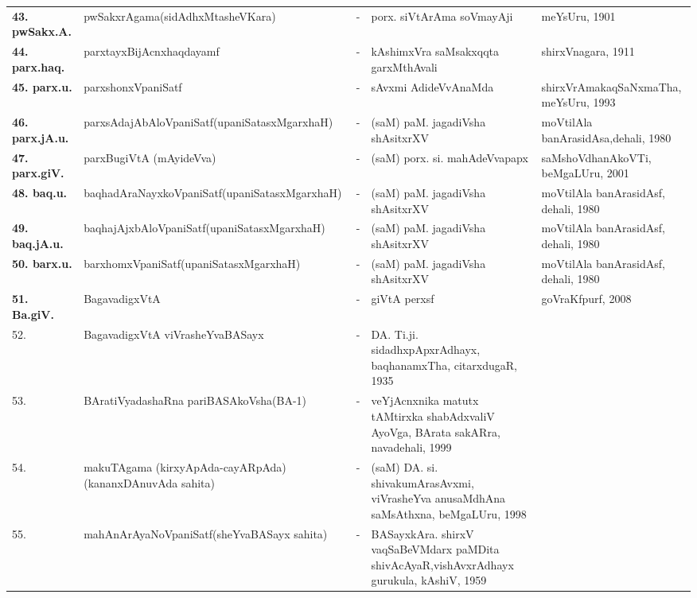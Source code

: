 {\begin{longtable}{lp{5cm}cp{5cm}<{\raggedright}p{3cm}<{\raggedright}@{}}
{\bf 43. pwSakx.A.} & pwSakxrAgama\newline (sidAdhxMtasheVKara) &-& porx. siVtArAma soVmayAji & meYsUru, 1901\\
{\bf 44. parx.haq.} & parxtayxBijAcnxhaqdayamf &-& kAshimxVra saMsakxqqta garxMthAvali & shirxVnagara, 1911\\
{\bf 45. parx.u.} & parxshonxVpaniSatf &-& sAvxmi AdideVvAnaMda & shirxVrAmakaqSaNxmaTha, meYsUru, 1993\\
{\bf 46. parx.jA.u.} & parxsAdajAbAloVpaniSatf\newline (upaniSatasxMgarxhaH) &-& (saM) paM. jagadiVsha shAsitxrXV & moVtilAla banArasidAsa,\newline dehali, 1980\\
{\bf 47. parx.giV.} & parxBugiVtA (mAyideVva) &-& (saM) porx. si. mahAdeVvapapx & saMshoVdhanAkoVTi, beMgaLUru, 2001\\
{\bf 48. baq.u.} & baqhadAraNayxkoVpaniSatf\newline (upaniSatasxMgarxhaH) &-& (saM) paM. jagadiVsha shAsitxrXV & moVtilAla banArasidAsf, dehali, 1980\\
{\bf 49. baq.jA.u.} & baqhajAjxbAloVpaniSatf\newline (upaniSatasxMgarxhaH) &-& (saM) paM. jagadiVsha shAsitxrXV & moVtilAla banArasidAsf, dehali, 1980\\
{\bf 50. barx.u.} & barxhomxVpaniSatf\newline (upaniSatasxMgarxhaH) &-& (saM) paM. jagadiVsha shAsitxrXV & moVtilAla banArasidAsf, dehali, 1980\\
{\bf 51. Ba.giV.} & BagavadigxVtA &-& giVtA perxsf & goVraKfpurf, 2008\\
52. & BagavadigxVtA viVrasheYvaBASayx &-& DA. Ti.ji. sidadhxpApxrAdhayx, baqhanamxTha, citarxdugaR, 1935\\
53. & BAratiVyadashaRna pariBASAkoVsha\newline (BA-1) &-& veYjAcnxnika matutx tAMtirxka shabAdxvaliV AyoVga, BArata sakARra, navadehali, 1999\\
54. & makuTAgama (kirxyApAda-cayARpAda)\newline (kananxDAnuvAda sahita) &-& (saM) DA. si. shivakumArasAvxmi, viVrasheYva anusaMdhAna saMsAthxna, beMgaLUru, 1998\\
55. & mahAnArAyaNoVpaniSatf\newline (sheYvaBASayx sahita) &-& BASayxkAra. shirxV vaqSaBeVMdarx paMDita shivAcAyaR,\newline vishAvxrAdhayx gurukula, kAshiV, 1959\\

\end{longtable}}
